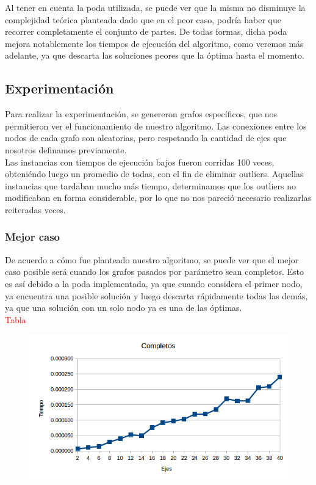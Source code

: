Al tener en cuenta la poda utilizada, se puede ver que la misma no disminuye la complejidad te\'orica planteada dado que en el peor caso, podr\'ia haber que recorrer completamente el conjunto de partes.
De todas formas, dicha poda mejora notablemente los tiempos de ejecuci\'on del algoritmo, como veremos m\'as adelante, ya que descarta las soluciones peores que la \'optima hasta el momento.


\subsection{Experimentaci\'on}
Para realizar la experimentaci\'on, se genereron grafos espec\'ificos, que nos permitieron ver el funcionamiento de nuestro algoritmo.
Las conexiones entre los nodos de cada grafo son aleatorias, pero respetando la cantidad de ejes que nosotros definamos previamente.\\

Las instancias con tiempos de ejecuci\'on bajos fueron corridas 100 veces, obteni\'endo luego un promedio de todas, con el fin de eliminar outliers.
Aquellas instancias que tardaban mucho m\'as tiempo, determinamos que los outliers no modificaban en forma considerable, por lo que no nos pareci\'o necesario realizarlas reiteradas veces.\\

\subsubsection{Mejor caso}
De acuerdo a c\'omo fue planteado nuestro algoritmo, se puede ver que el mejor caso posible ser\'a cuando los grafos pasados por par\'ametro sean completos.
Esto es as\'i debido a la poda implementada, ya que cuando considera el primer nodo, ya encuentra una posible soluci\'on y luego descarta r\'apidamente todas las dem\'as, ya que una soluci\'on con un solo nodo ya es una de las \'optimas.\\

\textcolor{red}{Tabla}

  \begin{figure}[h!]
   \begin{center}
 	\includegraphics[scale=0.7]{imagenes/exacto/Completos.png}
	\label{GrafoCompleto}
   \end{center}
 \end{figure}

